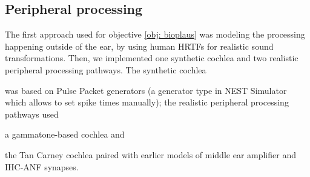 \documentclass[11pt,a4paper]{article}
\begin{document}
\subsection{Peripheral processing}
The first approach used for objective \ref{obj: bioplaus} was modeling the processing happening outside of the ear, by using human HRTFs for realistic sound transformations. Then, we implemented one synthetic cochlea and two realistic peripheral processing pathways. The synthetic cochlea 
\begin{inlinelist}
    \item was based on Pulse Packet generators (a generator type in NEST Simulator which allows to set spike times manually); the realistic peripheral processing pathways used 
    \item a gammatone-based cochlea and
    \item the Tan Carney cochlea paired with earlier models of middle ear amplifier and IHC-ANF synapses.
\end{inlinelist}
\end{document}
